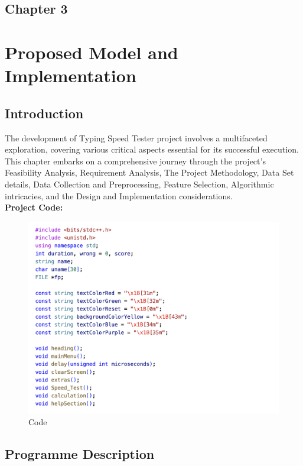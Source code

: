\begin{center}
    \section*{\fontsize{20}{20}\selectfont Chapter 3}
\end{center}
\vspace{10mm}
\section{Proposed Model and Implementation }
\subsection{Introduction}
The development of  Typing Speed Tester project involves a multifaceted exploration, covering various critical aspects essential for its successful execution. This chapter embarks on a comprehensive journey through the project's Feasibility Analysis, Requirement Analysis, The Project Methodology, Data Set details, Data Collection and Preprocessing, Feature Selection, Algorithmic intricacies, and the Design and Implementation considerations.\\

\textbf{ Project Code:}

\begin{figure}[h]
     \includegraphics[scale=0.2]{CodeScreenShot/include.png}
    \caption{Code}
    \label{fig:code-screenshots}
\end{figure}

\subsection{Programme Description}

